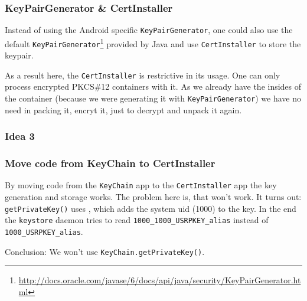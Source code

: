 \documentclass[a4paper]{scrartcl}
\begin{document}
		\subsubsection{KeyPairGenerator \& CertInstaller}
			Instead of using the Android specific \texttt{KeyPairGenerator}, one could also use the default \texttt{KeyPairGenerator}\footnote{\url{http://docs.oracle.com/javase/6/docs/api/java/security/KeyPairGenerator.html}} provided by Java and use \texttt{CertInstaller} to store the keypair.
			
			As a result here, the \texttt{CertInstaller} is restrictive in its usage. One can only process encrypted PKCS\#12 containers with it. As we already have the insides of the container (because we were generating it with \texttt{KeyPairGenerator}) we have no need in packing it, encryt it, just to decrypt and unpack it again.
			
		\subsubsection{Idea 3} %

		\subsubsection{Move code from KeyChain to CertInstaller}
			By moving code from the \texttt{KeyChain} app to the \texttt{CertInstaller} app the key generation and storage works. The problem here is, that  won't work. It turns out: \texttt{getPrivateKey()} uses , which adds the system uid (1000) to the key. In the end the \texttt{keystore} daemon tries to read \texttt{1000\_1000\_USRPKEY\_alias} instead of \texttt{1000\_USRPKEY\_alias}.
			
			Conclusion: We won't use \texttt{KeyChain.getPrivateKey()}.
			
\end{document}
